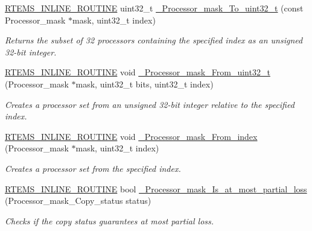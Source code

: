 \begin{DoxyCompactItemize}
\mbox{\hyperlink{group__RTEMSScoreBaseDefs_gac216239df231d5dbd15e3520b0b9313f}{R\+T\+E\+M\+S\+\_\+\+I\+N\+L\+I\+N\+E\+\_\+\+R\+O\+U\+T\+I\+NE}} uint32\+\_\+t \mbox{\hyperlink{group__RTEMSScoreProcessorMask_gaa99b514bbdaccbf67d8a063286fb7c92}{\+\_\+\+Processor\+\_\+mask\+\_\+\+To\+\_\+uint32\+\_\+t}} (const Processor\+\_\+mask $\ast$mask, uint32\+\_\+t index)
\begin{DoxyCompactList}\small\item\em Returns the subset of 32 processors containing the specified index as an unsigned 32-\/bit integer. \end{DoxyCompactList}\item 
\mbox{\hyperlink{group__RTEMSScoreBaseDefs_gac216239df231d5dbd15e3520b0b9313f}{R\+T\+E\+M\+S\+\_\+\+I\+N\+L\+I\+N\+E\+\_\+\+R\+O\+U\+T\+I\+NE}} void \mbox{\hyperlink{group__RTEMSScoreProcessorMask_ga5fee4f2abd78b71412d723ec25f2f41b}{\+\_\+\+Processor\+\_\+mask\+\_\+\+From\+\_\+uint32\+\_\+t}} (Processor\+\_\+mask $\ast$mask, uint32\+\_\+t bits, uint32\+\_\+t index)
\begin{DoxyCompactList}\small\item\em Creates a processor set from an unsigned 32-\/bit integer relative to the specified index. \end{DoxyCompactList}\item 
\mbox{\hyperlink{group__RTEMSScoreBaseDefs_gac216239df231d5dbd15e3520b0b9313f}{R\+T\+E\+M\+S\+\_\+\+I\+N\+L\+I\+N\+E\+\_\+\+R\+O\+U\+T\+I\+NE}} void \mbox{\hyperlink{group__RTEMSScoreProcessorMask_ga3f3d3596df7a92e88de6fdc264986546}{\+\_\+\+Processor\+\_\+mask\+\_\+\+From\+\_\+index}} (Processor\+\_\+mask $\ast$mask, uint32\+\_\+t index)
\begin{DoxyCompactList}\small\item\em Creates a processor set from the specified index. \end{DoxyCompactList}\item 
\mbox{\hyperlink{group__RTEMSScoreBaseDefs_gac216239df231d5dbd15e3520b0b9313f}{R\+T\+E\+M\+S\+\_\+\+I\+N\+L\+I\+N\+E\+\_\+\+R\+O\+U\+T\+I\+NE}} bool \mbox{\hyperlink{group__RTEMSScoreProcessorMask_ga8a92c0934ba3b9c2b9b1852f56d0a64f}{\+\_\+\+Processor\+\_\+mask\+\_\+\+Is\+\_\+at\+\_\+most\+\_\+partial\+\_\+loss}} (Processor\+\_\+mask\+\_\+\+Copy\+\_\+status status)
\begin{DoxyCompactList}\small\item\em Checks if the copy status guarantees at most partial loss. \end{DoxyCompactList}\item 

\end{DoxyCompactItemize}
